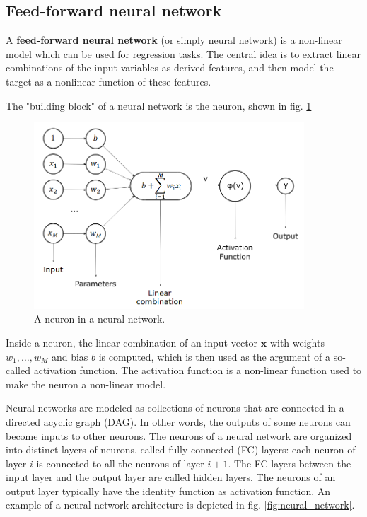 \subsection{Feed-forward neural network}
\label{sec:neural_network}
A \textbf{feed-forward neural network} (or simply neural network) is a non-linear model which can be used for regression tasks. The central idea is to extract linear combinations of the input variables as derived features, and then model the target as a nonlinear function of these features.

The "building block" of a neural network is the neuron, shown in fig. \ref{fig:neuron}

\begin{figure}
    \centering
    \includegraphics[width=0.9\textwidth]{images/neuron}
    \caption[A neuron in a NN]{A neuron in a neural network.}
    \label{fig:neuron}
\end{figure}

Inside a neuron, the linear combination of an input vector $\mathbf{x}$ with weights $w_1,\dots,w_M$ and bias $b$ is computed, which is then used as the argument of a so-called activation function. The activation function is a non-linear function used to make the neuron a non-linear model.

Neural networks are modeled as collections of neurons that are connected in a directed acyclic graph (DAG). In other words, the outputs of some neurons can become inputs to other neurons. The neurons of a neural network are organized into distinct layers of neurons, called fully-connected (FC) layers: each neuron of layer $i$ is connected to all the neurons of layer $i+1$. The FC layers between the input layer and the output layer are called hidden layers. The neurons of an output layer typically have the identity function as activation function. An example of a neural network architecture is depicted in fig. \ref{fig:neural_network}.

